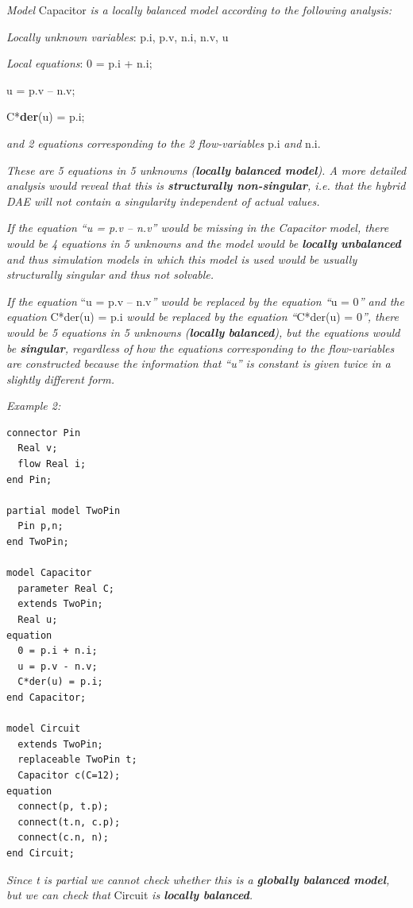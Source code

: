 \documentclass[10pt,a4paper]{report}
\begin{document}
\emph{Model} Capacitor \emph{is a locally balanced model according to
the following analysis:}

\emph{Locally unknown variables}: p.i, p.v, n.i, n.v, u

\emph{Local equations}: 0 = p.i + n.i;

u = p.v -- n.v;

C*\textbf{der}(u) = p.i;

\emph{and 2 equations corresponding to the 2 flow-variables} p.i
\emph{and} n.i.

\emph{These are 5 equations in 5 unknowns (\textbf{locally}
\textbf{balanced model}). A more detailed analysis would reveal that
this is \textbf{structurally non-singular}, i.e. that the hybrid DAE
will not contain a singularity independent of actual values.}

\emph{If the equation ``u = p.v -- n.v'' would be missing in the
Capacitor model, there would be 4 equations in 5 unknowns and the model
would be \textbf{locally} \textbf{unbalanced} and thus simulation models
in which this model is used would be usually structurally singular and
thus not solvable.}

\emph{If the equation} ``u = p.v -- n.v\emph{'' would be replaced by the
equation ``}u = 0\emph{'' and the equation} C*der(u) = p.i \emph{would
be replaced by the equation ``}C*der(u) = 0\emph{'', there would be 5
equations in 5 unknowns (\textbf{locally} \textbf{balanced}), but the
equations would be \textbf{singular}, regardless of how the equations
corresponding to the flow-variables are constructed because the
information that ``u'' is constant is given twice in a slightly
different form.}

\emph{Example 2:}

\begin{lstlisting}[language=modelica]
connector Pin
  Real v;
  flow Real i;
end Pin;

partial model TwoPin
  Pin p,n;
end TwoPin;

model Capacitor
  parameter Real C;
  extends TwoPin;
  Real u;
equation
  0 = p.i + n.i; 
  u = p.v - n.v;
  C*der(u) = p.i; 
end Capacitor;

model Circuit
  extends TwoPin;
  replaceable TwoPin t;
  Capacitor c(C=12);
equation
  connect(p, t.p);
  connect(t.n, c.p);
  connect(c.n, n);
end Circuit;
\end{lstlisting}

\emph{Since t is partial we cannot check whether this is a
\textbf{globally balanced model}, but we can check that} Circuit
\emph{is \textbf{locally balanced}.}
\end{document}
